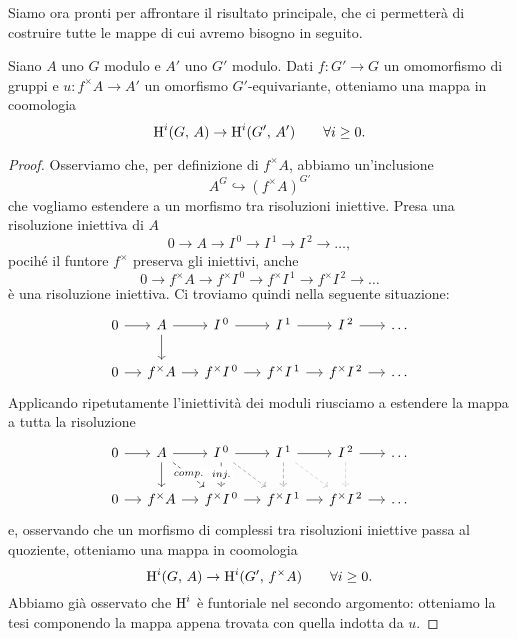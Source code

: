 Siamo ora pronti per affrontare il risultato principale, che ci permetterà di costruire tutte le mappe di cui avremo bisogno in seguito.
\begin{proposition}\label{funct}
	Siano  $ A $ uno $ G $ modulo e $ A' $ uno $ G' $ modulo. Dati $ f \colon G' \to G $ un omomorfismo di gruppi e $ u \colon f^\times A \to A' $ un omorfismo $ G' $-equivariante, otteniamo una mappa in coomologia
	\[ \operatorname{H}^i(G, \, A) \to \operatorname{H}^i(G', \, A') \qquad\forall i \geq 0. \]
\end{proposition}

\begin{proof}
	Osserviamo che, per definizione di $ f^\times A $, abbiamo un'inclusione
	\[ A^G \hookrightarrow \left(f^\times A\right)^{G'} \]
	che vogliamo estendere a un morfismo tra risoluzioni iniettive. Presa una risoluzione iniettiva di $ A $
	\[ 0 \to A \to I^{\,0} \to I^{\,1} \to I^{\,2} \to \dots, \]
	pocihé il funtore $ f^\times $ preserva gli iniettivi, anche
	\[ 0 \to f^\times A \to f^\times I^{\,0} \to f^\times I^{\,1} \to f^\times I^{\,2} \to \dots \]
	è una risoluzione iniettiva. Ci troviamo quindi nella seguente situazione:
	\[\begin{tikzcd}[column sep = small]
	0 \rar
	& A \rar \dar
	& I^{\,0} \rar
	& I^{\,1} \rar
	& I^{\,2} \rar
	& \dots \\
	0 \rar
	& f^\times A  \rar
	& f^\times I^{\,0} \rar 
	& f^\times I^{\,1} \rar 
	& f^\times I^{\, 2} \rar
	& \dots
	\end{tikzcd} \]
	Applicando ripetutamente l'iniettività dei moduli riusciamo a estendere la mappa a tutta la risoluzione 
	\[\begin{tikzcd}[column sep = small]
	0 \rar
	& A \dar \rar \arrow[dashed, "comp." description]{dr}
	& I^{\,0} \rar \dar[dashed, "inj." description] \arrow[dashed, gray]{dr}
	& I^{\,1} \rar \dar[dashed, gray] \arrow[dashed, gray!50]{dr}
	& I^{\,2} \dar[dashed, gray!50] \rar
	& \dots \\
	0 \rar
	& f^\times A \rar
	& f^\times I^{\,0} \rar
	& f^\times I^{\,1} \rar
	& f^\times I^{\,2} \rar
	& \dots
	\end{tikzcd} \]
	e, osservando che un morfismo di complessi tra risoluzioni iniettive passa al quoziente, otteniamo una mappa in coomologia
	\[ \operatorname{H}^i(G, \, A) \to \operatorname{H}^i(G', \, f^\times A) \qquad \forall i \geq 0. \]
	Abbiamo già osservato che $ \operatorname{H}^i $ è funtoriale nel secondo argomento: otteniamo la tesi componendo la mappa appena trovata con quella indotta da $ u $.
\end{proof}

